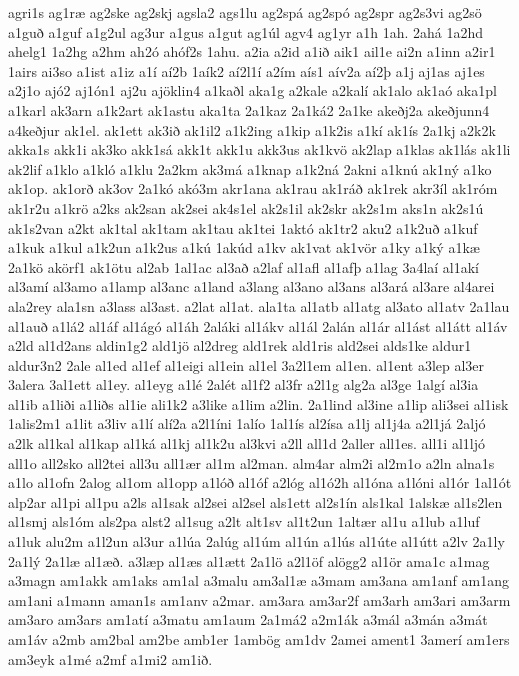 {agri1s
ag1ræ
ag2ske
ag2skj
agsla2
ags1lu
ag2spá
ag2spó
ag2spr
ag2s3vi
ag2sö
a1guð
a1guf
a1g2ul
ag3ur
a1gus
a1gut
ag1úl
agv4
ag1yr
a1h
1ah.
2ahá
1a2hd
ahelg1
1a2hg
a2hm
ah2ó
ahóf2s
1ahu.
a2ia
a2id
a1ið
aik1
ail1e
ai2n
a1inn
a2ir1
1airs
ai3so
a1ist
a1iz
a1í
aí2b
1aík2
aí2l1í
a2ím
aís1
aív2a
aí2þ
a1j
aj1as
aj1es
a2j1o
ajó2
aj1ón1
aj2u
ajöklin4
a1kaðl
aka1g
a2kale
a2kalí
ak1alo
ak1aó
aka1pl
a1karl
ak3arn
a1k2art
ak1astu
aka1ta
2a1kaz
2a1ká2
2a1ke
akeðj2a
akeðjunn4
a4keðjur
ak1el.
ak1ett
ak3ið
ak1il2
a1k2ing
a1kip
a1k2is
a1kí
ak1ís
2a1kj
a2k2k
akka1s
akk1i
ak3ko
akk1sá
akk1t
akk1u
akk3us
ak1kvö
ak2lap
a1klas
ak1lás
ak1li
ak2lif
a1klo
a1kló
a1klu
2a2km
ak3má
a1knap
a1k2ná
2akni
a1knú
ak1ný
a1ko
ak1op.
ak1orð
ak3ov
2a1kó
akó3m
akr1ana
ak1rau
ak1ráð
ak1rek
akr3íl
ak1róm
ak1r2u
a1krö
a2ks
ak2san
ak2sei
ak4s1el
ak2s1il
ak2skr
ak2s1m
aks1n
ak2s1ú
ak1s2van
a2kt
ak1tal
ak1tam
ak1tau
ak1tei
1aktó
ak1tr2
aku2
a1k2uð
a1kuf
a1kuk
a1kul
a1k2un
a1k2us
a1kú
1akúd
a1kv
ak1vat
ak1vör
a1ky
a1ký
a1kæ
2a1kö
akörf1
ak1ötu
al2ab
1al1ac
al3að
a2laf
al1afl
al1afþ
a1lag
3a4laí
al1akí
al3amí
al3amo
a1lamp
al3anc
a1land
a3lang
al3ano
al3ans
al3ará
al3are
al4arei
ala2rey
ala1sn
a3lass
al3ast.
a2lat
al1at.
ala1ta
al1atb
al1atg
al3ato
al1atv
2a1lau
al1auð
a1lá2
al1áf
al1ágó
al1áh
2aláki
al1ákv
al1ál
2alán
al1ár
al1ást
al1átt
al1áv
a2ld
al1d2ans
aldin1g2
ald1jö
al2dreg
ald1rek
ald1ris
ald2sei
alds1ke
aldur1
aldur3n2
2ale
al1ed
al1ef
al1eigi
al1ein
al1el
3a2l1em
al1en.
al1ent
a3lep
al3er
3alera
3al1ett
al1ey.
al1eyg
a1lé
2alét
al1f2
al3fr
a2l1g
alg2a
al3ge
1algí
al3ia
al1ib
a1liði
a1liðs
al1ie
ali1k2
a3like
a1lim
a2lin.
2a1lind
al3ine
a1lip
ali3sei
al1isk
1alis2m1
a1lit
a3liv
a1lí
alí2a
a2l1íni
1alío
1al1ís
al2ísa
a1lj
al1j4a
a2l1já
2aljó
a2lk
al1kal
al1kap
al1ká
al1kj
al1k2u
al3kvi
a2ll
all1d
2aller
all1es.
all1i
al1ljó
all1o
all2sko
all2tei
all3u
all1ær
al1m
al2man.
alm4ar
alm2i
al2m1o
a2ln
alna1s
a1lo
al1ofn
2alog
al1om
al1opp
a1lóð
al1óf
a2lóg
al1ó2h
al1óna
a1lóni
al1ór
1al1ót
alp2ar
al1pi
al1pu
a2ls
al1sak
al2sei
al2sel
als1ett
al2s1ín
als1kal
1alskæ
al1s2len
al1smj
als1óm
als2pa
alst2
al1sug
a2lt
alt1sv
al1t2un
1altær
al1u
a1lub
a1luf
a1luk
alu2m
a1l2un
al3ur
a1lúa
2alúg
al1úm
al1ún
a1lús
al1úte
al1útt
a2lv
2a1ly
2a1lý
2a1læ
al1æð.
a3læp
al1æs
al1ætt
2a1lö
a2l1öf
alögg2
al1ör
ama1c
a1mag
a3magn
am1akk
am1aks
am1al
a3malu
am3al1æ
a3mam
am3ana
am1anf
am1ang
am1ani
a1mann
aman1s
am1anv
a2mar.
am3ara
am3ar2f
am3arh
am3ari
am3arm
am3aro
am3ars
am1atí
a3matu
am1aum
2a1má2
a2m1ák
a3mál
a3mán
a3mát
am1áv
a2mb
am2bal
am2be
amb1er
1ambög
am1dv
2amei
ament1
3amerí
am1ers
am3eyk
a1mé
a2mf
a1mi2
am1ið.
}

